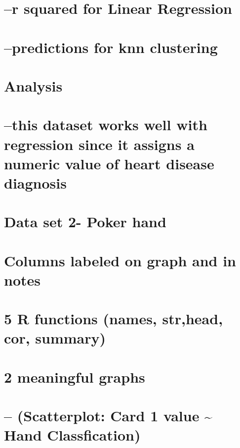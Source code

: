 \documentclass[]{article}
\begin{document}
\section{--r squared for Linear
Regression}\label{r-squared-for-linear-regression}

\section{--predictions for knn
clustering}\label{predictions-for-knn-clustering}

\section{Analysis}\label{analysis}

\section{--this dataset works well with regression since it assigns a
numeric value of heart disease
diagnosis}\label{this-dataset-works-well-with-regression-since-it-assigns-a-numeric-value-of-heart-disease-diagnosis}

\section{Data set 2- Poker hand}\label{data-set-2--poker-hand}

\section{Columns labeled on graph and in
notes}\label{columns-labeled-on-graph-and-in-notes-1}

\section{5 R functions (names, str,head, cor,
summary)}\label{r-functions-names-strhead-cor-summary-1}

\section{2 meaningful graphs}\label{meaningful-graphs-1}

\section{-- (Scatterplot: Card 1 value \textasciitilde{} Hand
Classfication)}\label{scatterplot-card-1-value-hand-classfication}
\end{document}
